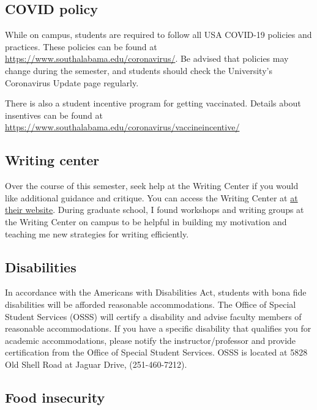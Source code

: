 \documentclass[11pt,]{article}
\begin{document}
\hypertarget{covid-policy}{%
\subsection{COVID policy}\label{covid-policy}}

While on campus, students are required to follow all USA COVID-19
policies and practices. These policies can be found at
\url{https://www.southalabama.edu/coronavirus/}. Be advised that
policies may change during the semester, and students should check the
University's Coronavirus Update page regularly.

There is also a student incentive program for getting vaccinated.
Details about insentives can be found at
\url{https://www.southalabama.edu/coronavirus/vaccineincentive/}

\hypertarget{writing-center}{%
\subsection{Writing center}\label{writing-center}}

Over the course of this semester, seek help at the Writing Center if you
would like additional guidance and critique. You can access the Writing
Center at
\href{https://www.southalabama.edu/departments/academicsuccess/cae/how.it.works.html}{at
their website}. During graduate school, I found workshops and writing
groups at the Writing Center on campus to be helpful in building my
motivation and teaching me new strategies for writing efficiently.

\hypertarget{disabilities}{%
\subsection{Disabilities}\label{disabilities}}

In accordance with the Americans with Disabilities Act, students with
bona fide disabilities will be afforded reasonable accommodations. The
Office of Special Student Services (OSSS) will certify a disability and
advise faculty members of reasonable accommodations. If you have a
specific disability that qualifies you for academic accommodations,
please notify the instructor/professor and provide certification from
the Office of Special Student Services. OSSS is located at 5828 Old
Shell Road at Jaguar Drive, (251-460-7212).

\hypertarget{food-insecurity}{%
\subsection{Food insecurity}\label{food-insecurity}}
\end{document}

